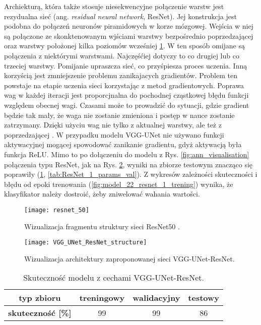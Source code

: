 {\parindent0pt
Archiekturą, która także stosuje niesekwencyjne połączenie warstw jest rezydualna sieć (ang. \textit{residual neural network}, ResNet). Jej konstrukcja jest podobna do połączeń neuronów piramidowych w korze mózgowej. Wejścia w niej są połączone ze skonktenowanym wjściami warstwy bezpośrednio poprzedzającej oraz warstwy położonej kilka poziomów wcześniej \ref{fig:resnet_50}. W ten sposób omijane są połączenia z niektórymi warstwami. Najczęśćiej dotyczy to co drugiej lub co trzeciej warstwy. Pomijanie upraszcza sieć, co przyśpiesza proces uczenia. Inną korzyścią jest zmniejszenie problemu zanikajacych gradientów. Problem ten powstaje na etapie uczenia sieci korzystając z metod gradientowych. Poprawa wag w każdej iteracji jest proporcjnalna do pochodnej cząstkowej błędu funkcji względem obecnej wagi. Czasami może to prowadzić do sytuacji, gdzie gradient będzie tak mały, że waga nie zostanie zmieniona i postęp w nauce zostanie zatrzymany. Dzięki użyciu wag nie tylko z aktualnej warstwy, ale też z poprzedzającej \cite{vanishing_gradinets}. W przypadku modelu VGG-UNet nie używano funkcji aktywacyjnej mogącej spowodować zanikanie gradientu, gdyż aktywacją była funkcja ReLU. Mimo to po dołączeniu do modelu z Rys. \ref{fig:ann_visualisation}  połączenia typu ResNet, jak na Rys. \ref{fig:VGG_UNet_ResNet_structure}, wyniki na zbiorze testowym znacząco się poprawiły (\ref{tab:ResNet_1_acc}, \ref{tab:ResNet_1_params_val}). Z wykresów zależności skuteczności i błędu od epoki trenowania (\ref{fig:model_22_resnet_1_trening}) wynika, że klasyfikator należy dostroić, żeby zniwelować wahania wartości.

\begin{figure}[h!]
	\centering
	\centering
		\texttt{[image: resnet\_50]}	
	\caption{Wizualizacja fragmentu struktury sieci ResNet50 \cite{Res_Net_architecture}.}	\label{fig:resnet_50}
\end{figure}

\begin{figure}[h!]
	\centering
	\centering
		\texttt{[image: VGG\_UNet\_ResNet\_structure]}	
	\caption{Wizualizacja architektury zaproponowanej sieci VGG-UNet-ResNet.}	\label{fig:VGG_UNet_ResNet_structure}
\end{figure}

\begin{table}[h!]
\centering
\caption[Short Heading]{Skuteczność modelu z cechami VGG-UNet-ResNet.}
\label{tab:ResNet_1_acc}
\begin{tabular}{|c|c|c|c|}
\hline
\textbf{typ zbioru}           & \textbf{treningowy} & \textbf{walidacyjny} & \textbf{testowy} \\ \hline
\textbf{skuteczność {[}\%{]}} & 99                  & 99                   & 86               \\ \hline
\end{tabular}
\end{table}

}
